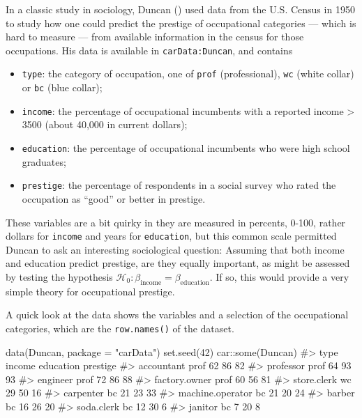 \documentclass[
  letterpaper,
  10pt,
  krantz2]{krantz}
\makeatletter
\newenvironment{Shaded}{\begin{snugshade}}{\end{snugshade}}
\newcommand{\AttributeTok}[1]{\textcolor[rgb]{0.40,0.45,0.13}{#1}}
\newcommand{\CommentTok}[1]{\textcolor[rgb]{0.37,0.37,0.37}{#1}}
\newcommand{\DecValTok}[1]{\textcolor[rgb]{0.68,0.00,0.00}{#1}}
\newcommand{\FunctionTok}[1]{\textcolor[rgb]{0.28,0.35,0.67}{#1}}
\newcommand{\NormalTok}[1]{\textcolor[rgb]{0.00,0.23,0.31}{#1}}
\newcommand{\SpecialCharTok}[1]{\textcolor[rgb]{0.37,0.37,0.37}{#1}}
\newcommand{\StringTok}[1]{\textcolor[rgb]{0.13,0.47,0.30}{#1}}
\providecommand{\tightlist}{%
  \setlength{\itemsep}{0pt}\setlength{\parskip}{0pt}}\usepackage{longtable,booktabs,array}
\newenvironment{kframe}{%
  \medskip{}
  \setlength{\fboxsep}{.8em}
  \def\at@end@of@kframe{}%
  \ifinner\ifhmode%
  \def\at@end@of@kframe{\end{minipage}}%
  \begin{minipage}{\columnwidth}%
  \fi\fi%
  \def\FrameCommand##1{\hskip\@totalleftmargin \hskip-\fboxsep
  \colorbox{shadecolor}{##1}\hskip-\fboxsep
      \hskip-\linewidth \hskip-\@totalleftmargin \hskip\columnwidth}%
  \MakeFramed {\advance\hsize-\width
    \@totalleftmargin\z@ \linewidth\hsize
    \@setminipage}}%
{\par\unskip\endMakeFramed%
  \at@end@of@kframe}
\renewenvironment{Shaded}{\begin{kframe}}{\end{kframe}}
\makeatother
\begin{document}
In a classic study in sociology, Duncan ()
used data from the U.S. Census in 1950 to study how one could predict
the prestige of occupational categories --- which is hard to measure ---
from available information in the census for those occupations. His data
is available in \texttt{carData:Duncan}, and contains

\begin{itemize}
\tightlist
\item
  \texttt{type}: the category of occupation, one of \texttt{prof}
  (professional), \texttt{wc} (white collar) or \texttt{bc} (blue
  collar);
\item
  \texttt{income}: the percentage of occupational incumbents with a
  reported income \textgreater{} 3500 (about 40,000 in current dollars);
\item
  \texttt{education}: the percentage of occupational incumbents who were
  high school graduates;
\item
  \texttt{prestige}: the percentage of respondents in a social survey
  who rated the occupation as ``good'' or better in prestige.
\end{itemize}

These variables are a bit quirky in they are measured in percents,
0-100, rather dollars for \texttt{income} and years for
\texttt{education}, but this common scale permitted Duncan to ask an
interesting sociological question: Assuming that both income and
education predict prestige, are they equally important, as might be
assessed by testing the hypothesis
\(\mathcal{H}_0: \beta_{\text{income}} = \beta_{\text{education}}\). If
so, this would provide a very simple theory for occupational prestige.

A quick look at the data shows the variables and a selection of the
occupational categories, which are the \texttt{row.names()} of the
dataset.

\begin{Shaded}
\begin{Highlighting}[]
\FunctionTok{data}\NormalTok{(Duncan, }\AttributeTok{package =} \StringTok{"carData"}\NormalTok{)}
\FunctionTok{set.seed}\NormalTok{(}\DecValTok{42}\NormalTok{)}
\NormalTok{car}\SpecialCharTok{::}\FunctionTok{some}\NormalTok{(Duncan)}
\CommentTok{\#\textgreater{}                  type income education prestige}
\CommentTok{\#\textgreater{} accountant       prof     62        86       82}
\CommentTok{\#\textgreater{} professor        prof     64        93       93}
\CommentTok{\#\textgreater{} engineer         prof     72        86       88}
\CommentTok{\#\textgreater{} factory.owner    prof     60        56       81}
\CommentTok{\#\textgreater{} store.clerk        wc     29        50       16}
\CommentTok{\#\textgreater{} carpenter          bc     21        23       33}
\CommentTok{\#\textgreater{} machine.operator   bc     21        20       24}
\CommentTok{\#\textgreater{} barber             bc     16        26       20}
\CommentTok{\#\textgreater{} soda.clerk         bc     12        30        6}
\CommentTok{\#\textgreater{} janitor            bc      7        20        8}
\end{Highlighting}
\end{Shaded}
\end{document}
